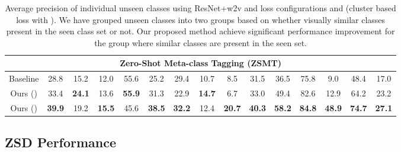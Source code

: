 \documentclass[runningheads]{llncs}
\begin{document}
\begin{table}[!t]
\begin{center}
{\begin{tabular}{|c|c||c|c|c|c|c|c|c|c|c|c|c||c|c|c|c|c|c|c|c|c|c|c|c|}
\multicolumn{25}{|c|}{Zero-Shot Meta-class Tagging (ZSMT)} \\ \hline 

Baseline& 28.8&\multicolumn{2}{c|}{15.2}&\multicolumn{2}{c|}{12.0}&\multicolumn{2}{c|}{55.6}&\multicolumn{2}{c|}{25.2}&29.4&\multicolumn{2}{c||}{10.7}&8.5&\multicolumn{2}{c|}{31.5}&\multicolumn{2}{c|}{36.5}&\multicolumn{2}{c|}{75.8}&9.0&\multicolumn{2}{c|}{48.4}&\multicolumn{2}{c|}{17.0} \\

Ours ()&33.4& \multicolumn{2}{c|}{\textbf{24.1}}&\multicolumn{2}{c|}{13.6}&\multicolumn{2}{c|}{\textbf{55.9}}&\multicolumn{2}{c|}{31.3}&22.9&\multicolumn{2}{c||}{\textbf{14.7}}&6.7&\multicolumn{2}{c|}{33.0}&\multicolumn{2}{c|}{49.4}&\multicolumn{2}{c|}{82.6}&12.9&\multicolumn{2}{c|}{64.2}&\multicolumn{2}{c|}{23.2} \\


Ours ()& \textbf{39.9}&\multicolumn{2}{c|}{19.2}&\multicolumn{2}{c|}{\textbf{15.5}}&\multicolumn{2}{c|}{45.6}&\multicolumn{2}{c|}{\textbf{38.5}}&\textbf{32.2}&\multicolumn{2}{c||}{12.4}&\textbf{20.7}&\multicolumn{2}{c|}{\textbf{40.3}}&\multicolumn{2}{c|}{\textbf{58.2}}&\multicolumn{2}{c|}{\textbf{84.8}}&\textbf{48.9}&\multicolumn{2}{c|}{\textbf{74.7}}&\multicolumn{2}{c|}{\textbf{27.1}} \\ \hline

    \end{tabular}}
  \end{center}
  \vspace{-0.5em}
  \caption{Average precision of individual unseen classes using ResNet+w2v and loss configurations  and  (cluster based loss with ). We have grouped unseen classes into two groups based on whether visually similar classes present in the seen class set or not. Our proposed method achieve significant performance improvement for the group where similar classes are present in the seen set.} 
  \vspace{-1.5em}
  \label{tab:individual_map}
\end{table}





\subsection{ZSD Performance}
\end{document}
